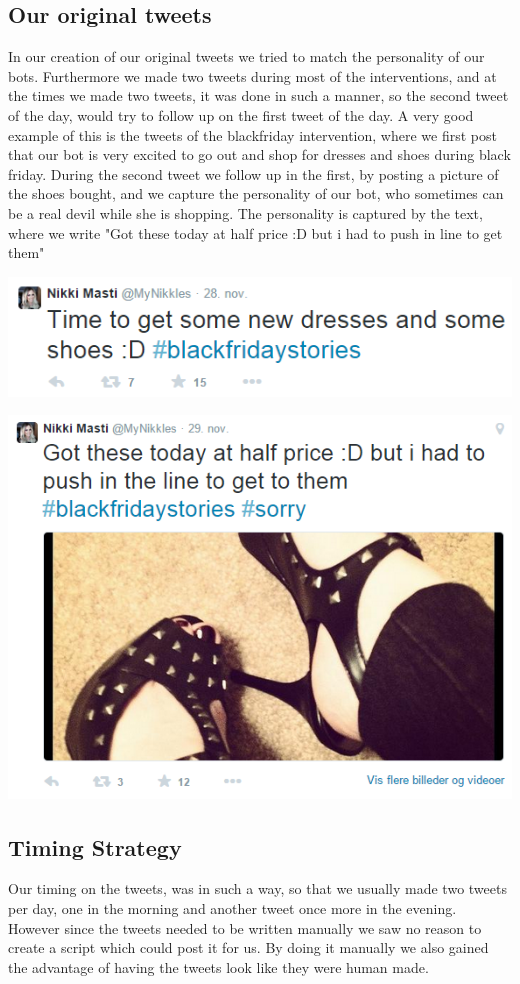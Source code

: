 \subsection{Our original tweets}
In our creation of our original tweets we tried to  match the personality of our bots. Furthermore we made two tweets during most of the interventions, and at the times we made two tweets, it was done in such a manner, so the second tweet of the day, would try to follow up on the first tweet of the day. A very good example of this is the tweets of the blackfriday intervention, where we first post that our bot is very excited to go out and shop for dresses and shoes during black friday. During the second tweet we follow up in the first, by posting a picture of the shoes bought, and we capture the personality of our bot, who sometimes can be a real devil while she is shopping. The personality is captured by the text, where we write "Got these today at half price :D but i had to push in line to get them" 

\includegraphics[scale=0.5]{intervention_blackfriday}

\includegraphics[scale=0.5]{intervention_blackfriday2}

\subsection{Timing Strategy}
Our timing on the tweets, was in such a way, so that we usually made two tweets per day, one in the morning and another tweet once more in the evening. However since the tweets needed to be written manually we saw no reason to create a script which could post it for us. By doing it manually we also gained the advantage of having the tweets look like they were human made.
